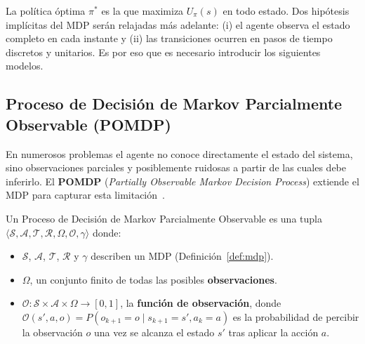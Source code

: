 La política óptima $\pi^\ast$ es la que maximiza $U_\pi(s)$ en todo estado. Dos hipótesis implícitas del MDP serán relajadas más adelante: (i) el agente observa el estado completo en cada instante y (ii) las transiciones ocurren en pasos de tiempo discretos y unitarios. Es por eso que es necesario introducir los siguientes modelos.


\subsection{Proceso de Decisión de Markov Parcialmente Observable (POMDP)} \label{subsec:pomdp} %

En numerosos problemas el agente no conoce directamente el estado del sistema, sino observaciones parciales y posiblemente ruidosas a partir de las cuales debe inferirlo. El \textbf{POMDP} (\textit{Partially Observable Markov Decision Process}) extiende el MDP para capturar esta limitación~\cite{kaelbling1998planning}.

\begin{definicion}[POMDP] \label{def:pomdp} 
Un Proceso de Decisión de Markov Parcialmente Observable es una tupla $\langle\mathcal{S},\mathcal{A},\mathcal{T},\mathcal{R},\Omega,\mathcal{O}, \gamma\rangle$ donde: 
\begin{itemize}   
    \item $\mathcal{S}$, $\mathcal{A}$, $\mathcal{T}$, $\mathcal{R}$ y $\gamma$ describen un MDP (Definición~\ref{def:mdp}).
    \item $\Omega$, un conjunto finito de todas las posibles \textbf{observaciones}.   
    \item $\mathcal{O}:\mathcal{S}\times\mathcal{A}\times\Omega\to[0,1]$, la \textbf{función de observación}, donde $\mathcal{O}(s',a,o)=P(o_{k+1}=o\mid s_{k+1}=s',a_k=a)$ es la probabilidad de percibir la observación $o$ una vez se alcanza el estado $s'$ tras aplicar la acción $a$. 
\end{itemize} 
\end{definicion}

